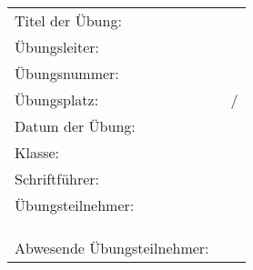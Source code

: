 \begin{table}[h]
	{\large
	\begin{tabular}{ll}
		Titel der Übung:            & \uebungstitel                      \\
		Übungsleiter:               & \uebungsleiter                     \\
		Übungsnummer:               & \uebungsnummer                     \\
		Übungsplatz:                & \labor\ / \nummerderabnahmeeinheit \\
		Datum der Übung:            & \uebungsdatum                      \\
		Klasse:                     & \klasse                            \\
		Schriftführer:              & \schriftfuehrer                    \\
		Übungsteilnehmer:           & \uebungsteilnehmerI                \\
									& \uebungsteilnehmerII               \\
									& \uebungsteilnehmerIII              \\
									& \uebungsteilnehmerIV               \\
		Abwesende Übungsteilnehmer: \abwesendeuebungsteilnehmer

	\end{tabular}
	}
\end{table}

\tableofcontents

\newpage
